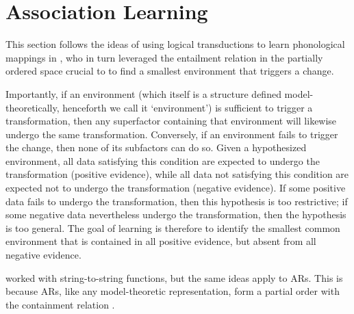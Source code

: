 \documentclass[pmlr]{jmlr}%
\begin{document}
	\section{Association Learning}
	This section follows the ideas of using logical transductions to learn
	phonological mappings in \citet{yolyan2025logical}, who in turn
	leveraged the entailment relation in the partially ordered space
	crucial to \citet{chandleeBufia2019} 
	to find a smallest environment that triggers a change.
	
	Importantly, if an environment (which itself is a structure defined
	model-theoretically,
	henceforth we call it `environment') is sufficient to trigger a
	transformation, then any superfactor containing that environment will
	likewise undergo the same transformation. Conversely, if an environment 
	fails to trigger the change, then none of its subfactors can do so.
	Given a hypothesized environment, all data satisfying this
	condition are expected to undergo the transformation (positive
	evidence), while all data not satisfying this condition are expected
	not to undergo the transformation (negative evidence). If some
	positive data fails to undergo the transformation, then this hypothesis
	is too restrictive; if some negative data nevertheless
	undergo the transformation, then the hypothesis is too general. The
	goal of learning is therefore to identify the smallest common
	environment that is contained in all positive evidence, but absent from
	all negative evidence. 
	
	\citet{yolyan2025logical} worked with string-to-string functions, but the same ideas apply to ARs.
	This is because ARs, like any model-theoretic representation, form a partial order with the containment relation \citep{chandleeBufia2019}.
	
	
	
	
\end{document}
